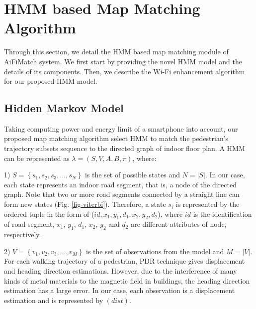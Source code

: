 \documentclass[conference]{IEEEtran}
\begin{document}
\section{HMM based Map Matching Algorithm}

Through this section, we detail the HMM based map matching module of AiFiMatch system. We first start by providing the novel HMM model and the details of its components. Then, we describe the Wi-Fi enhancement algorithm for our proposed HMM model.

\subsection{Hidden Markov Model}

Taking computing power and energy limit of a smartphone into account, our proposed map matching algorithm select HMM to match the pedestrian's trajectory subsets sequence to the directed graph of indoor floor plan. A HMM can be represented as $\lambda  = (S,V,A,B,\pi)$, where:

1) $S = \left\{ {{s_1},{s_2},{s_3}, \ldots ,{s_N}} \right\}$ is the set of possible states and $N = \left| S \right|$. In our case, each state represents an indoor road segment, that is, a node of the directed graph. Note that two or more road segments connected by a straight line can form new states (Fig. \ref{fig-viterbi}). Therefore, a state $s_i$ is represented by the ordered tuple in the form of ($id,x_{1},y_{1},d_{1},x_{2},y_{2},d_{2}$), where $id$ is the identification of road segment, $x_{1}$, $y_{1}$, $d_{1}$, $x_{2}$, $y_{2}$ and $d_{2}$ are different attributes of node, respectively. 

2) $V = \left\{ {{v_1},{v_2},{v_3}, \ldots ,{v_M}} \right\}$ is the set of observations from the model and $M = \left| V \right|$. For each walking trajectory of a pedestrian, PDR technique gives displacement and heading direction estimations. However, due to the interference of many kinds of metal materials to the magnetic field in buildings, the heading direction estimation has a large error. In our case, each observation is a displacement estimation and is represented by $(dist)$.
\end{document}
